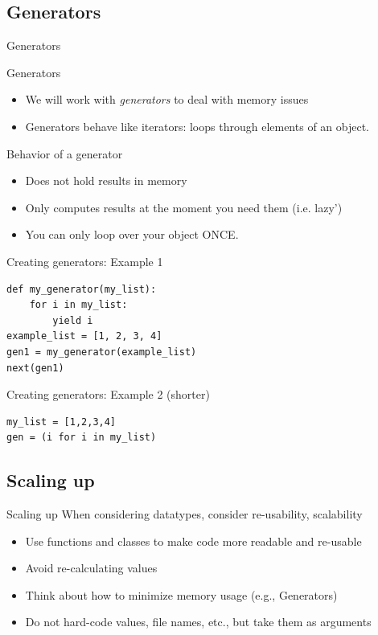 \documentclass{beamer}
\begin{document}
\subsection{Generators}
\begin{frame}{Generators}
\begin{block}{Generators}
	\begin{itemize}[<+->]
		\item We will work with \textit{generators} to deal with memory issues
		\item Generators behave like iterators: loops through elements of an object. 
	\end{itemize}
\end{block}
\pause
\begin{exampleblock}{Behavior of a generator}
	\begin{itemize}[<+->]
		\item Does not hold results in memory
		\item Only computes results at the moment you need them (i.e. lazy')
		\item You can only loop over your object ONCE.
	\end{itemize}
\end{exampleblock}
\end{frame}

\begin{frame}
Creating generators: Example 1 
\begin{lstlisting}
def my_generator(my_list):	
    for i in my_list:
        yield i
example_list = [1, 2, 3, 4]
gen1 = my_generator(example_list)        
next(gen1)
\end{lstlisting}
\end{frame}


\begin{frame}
Creating generators: Example 2 (shorter)
\begin{lstlisting}
my_list = [1,2,3,4]
gen = (i for i in my_list)
\end{lstlisting}
\end{frame}


\subsection{Scaling up}
\begin{frame}{Scaling up}
When considering datatypes, consider re-usability, scalability
	\begin{itemize}
		\item Use functions and classes to make code more readable and re-usable
		\item Avoid re-calculating values
		\item Think about how to minimize memory usage (e.g., Generators)
		\item Do not hard-code values, file names, etc., but take them as arguments
	\end{itemize}	
\end{frame}
\end{document}
